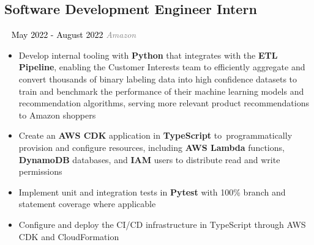 \documentclass{article}
\newcommand{\resumesection}[3]{
    \subsection*{#1}
    \ 
    \normalsize
    \normalsize
    \hfill
    \textcolor{black}{#3}
    \normalsize
    \newline
    \small
    \textcolor{grey}{\emph{#2}}
}
\begin{document}
\resumesection{Software Development Engineer Intern}{Amazon}{May 2022 - August 2022}
\begin{itemize}
    \item Develop internal tooling with \textbf{Python} that integrates with the \textbf{ETL Pipeline}, enabling the Customer Interests team to efficiently aggregate and convert thousands of binary labeling data into high confidence datasets to train and benchmark the performance of their machine learning models and recommendation algorithms, serving more relevant product recommendations to Amazon shoppers
    \item Create an \textbf{AWS CDK} application in \textbf{TypeScript} to\ programmatically provision and configure resources, including \textbf{AWS Lambda} functions, \textbf{DynamoDB} databases, and \textbf{IAM} users to distribute read and write permissions
    \item Implement unit and integration tests in \textbf{Pytest} with 100\% branch and statement coverage where applicable
    \item Configure and deploy the CI/CD infrastructure in TypeScript through AWS CDK and CloudFormation
\end{itemize}
\end{document}
